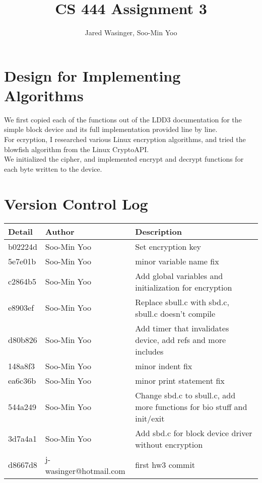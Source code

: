 \documentclass[letterpaper,10pt]{article}
\title{CS 444 Assignment 3}
\author{Jared Wasinger, Soo-Min Yoo}
\begin{document}
\maketitle
\newpage

\section*{Design for Implementing Algorithms}
	We first copied each of the functions out of the LDD3 documentation for the simple block device and its full implementation provided line by line.\\
    For ecryption, I researched various Linux encryption algorithms, and tried the blowfish algorithm from the Linux CryptoAPI. \\
    We initialized the cipher, and implemented encrypt and decrypt functions for each byte written to the device.\\
    
\section*{Version Control Log}
\begin{tabular}{l l l}\textbf{Detail} & \textbf{Author} & \textbf{Description}\\\hline
b02224d & Soo-Min Yoo & Set encryption key\\\hline
5e7e01b & Soo-Min Yoo & minor variable name fix\\\hline
c2864b5 & Soo-Min Yoo & Add global variables and initialization for encryption\\\hline
e8903ef & Soo-Min Yoo & Replace sbull.c with sbd.c, sbull.c doesn't compile\\\hline
d80b826 & Soo-Min Yoo & Add timer that invalidates device, add refs and more includes\\\hline
148a8f3 & Soo-Min Yoo & minor indent fix\\\hline
ea6c36b & Soo-Min Yoo & minor print statement fix\\\hline
544a249 & Soo-Min Yoo & Change sbd.c to sbull.c, add more functions for bio stuff and init/exit\\\hline
3d7a4a1 & Soo-Min Yoo & Add sbd.c for block device driver without encryption\\\hline
d8667d8 & j-wasinger@hotmail.com & first hw3 commit\\\hline

\end{tabular}
\end{document}
